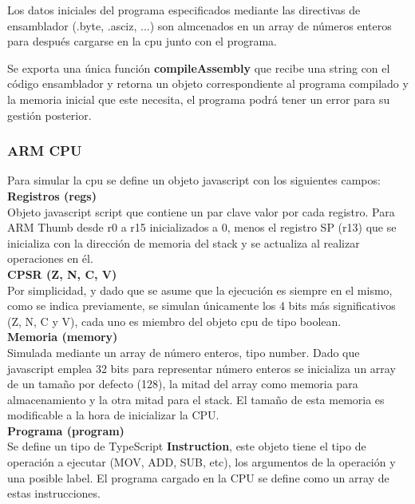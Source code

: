 {        Los datos iniciales del programa especificados mediante las directivas de ensamblador (.byte, .asciz, ...)
        son almcenados en un array de números enteros para después cargarse en la cpu junto con el programa.

        Se exporta una única función \textbf{compileAssembly} que recibe una string con el código ensamblador y retorna un objeto
        correspondiente al programa compilado y la memoria inicial que este necesita, el programa podrá tener un error
        para su gestión posterior. 

        \subsubsection{ARM CPU}
        Para simular la cpu se define un objeto javascript con los siguientes campos: \\

        \textbf{Registros (regs)} \\
        Objeto javascript script que contiene un par clave valor por cada registro.
        Para ARM Thumb desde r0 a r15 inicializados a 0, menos el registro SP (r13)
        que se inicializa con la dirección de memoria del stack y se actualiza al realizar operaciones en él. \\

        \textbf{CPSR (Z, N, C, V)} \\
        Por simplicidad, y dado que se asume que la ejecución es siempre en el mismo, como se indica previamente,
        se simulan únicamente los 4 bits más significativos (Z, N, C y V), cada uno es miembro del objeto cpu
        de tipo boolean. \\

        \textbf{Memoria (memory)} \\
        Simulada mediante un array de número enteros, tipo number. Dado que javascript emplea 32 bits para representar número enteros
        se inicializa un array de un tamaño por defecto (128), la mitad del array como memoria para almacenamiento y la otra mitad para el stack.
        El tamaño de esta memoria es modificable a la hora de inicializar la CPU. \\
        
        \textbf{Programa (program)} \\
        Se define un tipo de TypeScript \textbf{Instruction}, este objeto tiene el tipo de operación a ejecutar
        (MOV, ADD, SUB, etc), los argumentos de la operación y una posible label. El programa cargado en la CPU se define como un array de estas instrucciones. \\

}
